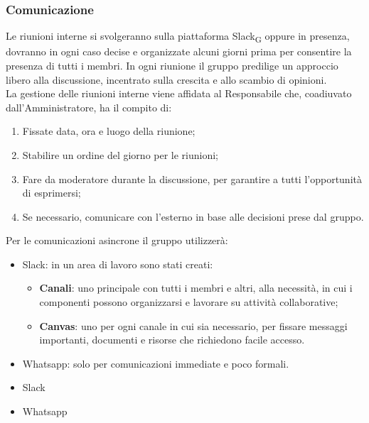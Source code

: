 \subsubsection{Comunicazione}
Le riunioni interne si svolgeranno sulla piattaforma Slack\textsubscript{G} oppure in presenza, dovranno in ogni caso decise e organizzate alcuni giorni prima per consentire la presenza di tutti i membri. In ogni riunione il gruppo predilige un approccio libero alla discussione, incentrato sulla crescita e allo scambio di opinioni. \\
La gestione delle riunioni interne viene affidata al Responsabile che, coadiuvato dall'Amministratore, ha il compito di:
\begin{enumerate}
    \item Fissate data, ora e luogo della riunione;
    \item Stabilire un ordine del giorno per le riunioni;
    \item Fare da moderatore durante la discussione, per garantire a tutti l'opportunità di esprimersi;
    \item Se necessario, comunicare con l'esterno in base alle decisioni prese dal gruppo.
\end{enumerate}
Per le comunicazioni asincrone il gruppo utilizzerà:
\begin{itemize}
    \item Slack: in un area di lavoro sono stati creati:
            \begin{itemize}
                \item \textbf{Canali}: uno principale con tutti i membri e altri, alla necessità, in cui i componenti possono organizzarsi e lavorare su attività collaborative;
                \item \textbf{Canvas}: uno per ogni canale in cui sia necessario, per fissare messaggi importanti, documenti e risorse che richiedono facile accesso.
            \end{itemize}
    \item Whatsapp: solo per comunicazioni immediate e poco formali.
\end{itemize}
\begin{itemize}
    \item Slack
    \item Whatsapp
\end{itemize}


